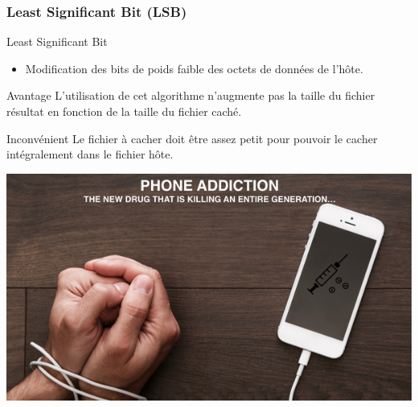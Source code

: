 \documentclass{beamer}
\begin{document}
	\subsubsection{Least Significant Bit (LSB)}
	\begin{frame}
  
	\begin{block}{Least Significant Bit}
	\begin{itemize}
	[circle]
	\item Modification des bits de poids faible des octets de données de 
	l'hôte. 
	\end{itemize}
	\end{block}
	
	\begin{exampleblock}{Avantage} 
	L'utilisation de cet algorithme n'augmente pas la taille du fichier 
	résultat en fonction de la taille du fichier caché. 
	\end{exampleblock}
	
	\begin{alertblock}{Inconvénient} 
	Le fichier à cacher doit être assez petit pour pouvoir le cacher intégralement 
	dans le fichier hôte. 
	\end{alertblock}
	
	\hspace{2.5cm}
    \includegraphics[scale=0.1]{ANGS3/addiction.png}
	\end{frame}
  
\end{document}
